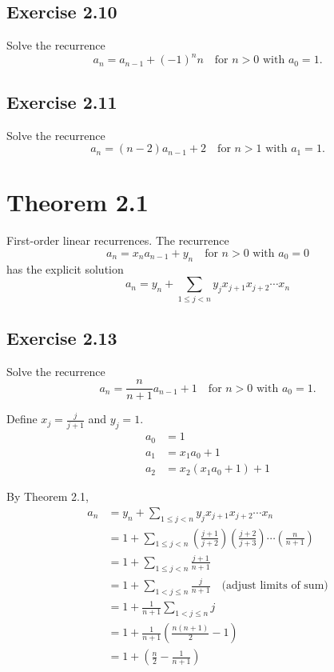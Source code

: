 \documentclass[11pt, oneside]{article}   	%
\begin{document}
\subsection*{Exercise 2.10}
Solve the recurrence
\[
	a_n = a_{n-1} + (-1)^n n \quad \text{for $n>0$ with $a_0=1$.}
\]

\subsection*{Exercise 2.11}

Solve the recurrence
\[
	a_n = (n-2)a_{n-1} + 2 \quad \text{for $n>1$ with $a_1=1$.}
\]


\section*{Theorem 2.1}
First-order linear recurrences. The recurrence
\[
	a_n = x_n a_{n-1} + y_n \quad \text{for $n>0$ with $a_0=0$}
\]
has the explicit solution
\[
	a_n = y_n + \sum_{1 \le j < n} y_j x_{j+1} x_{j+2} \cdots x_n
\]

\subsection*{Exercise 2.13}
Solve the recurrence
\[
	a_n = \frac{n}{n+1} a_{n-1} + 1	\quad \text{for $n>0$ with $a_0=1$.}
\]

Define $x_j = \frac{j}{j+1}$ and $y_j=1$.
\begin{align*}
	a_0 &= 1 \\
	a_1 &= x_1 a_0 + 1 \\
	a_2 &= x_2 (x_1 a_0 + 1) + 1
\end{align*}

By Theorem 2.1,
\begin{align*}
	a_n &= y_n + \sum_{1\le j < n} y_j x_{j+1} x_{j+2} \cdots x_n \\
		&= 1 + \sum_{1 \le j < n} \left(\frac{j+1}{j+2}\right) \left(\frac{j+2}{j+3}\right) \cdots \left(\frac{n}{n+1}\right) \\
		&= 1 + \sum_{1 \le j < n} \frac{j+1}{n+1} \\
		&= 1 + \sum_{1 < j \le n} \frac{j}{n+1} \quad \text{(adjust limits of sum)} \\
		&= 1 + \frac{1}{n+1} \sum_{1 < j \le n} j \\
		&= 1 + \frac{1}{n+1} \left( \frac{n(n+1)}{2} -1 \right) \\
		&= 1 + \left( \frac{n}{2} - \frac{1}{n+1} \right)
\end{align*}
\end{document}
